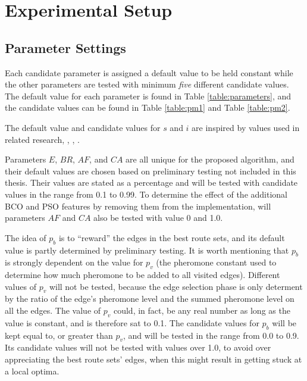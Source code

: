 \section{Experimental Setup}


\subsection{Parameter Settings}
\label{subsec:parameterSettings_setup}

Each candidate parameter is assigned a default value to be held constant while the other parameters are tested with minimum \textit{five} different candidate values. The default value for each parameter is found in Table \vref{table:parameters}, and the candidate values can be found in Table \vref{table:pm1} and Table \vref{table:pm2}.

The default value and candidate values for $s$ and $i$ are inspired by values used in related research\citep{salehi-nezhad07}, \citep{poorzahedy11}, \citep{sedighpour14}, \citep{kechagiopoulos14}.

Parameters $E$, $BR$, $AF$, and $CA$ are all unique for the proposed algorithm, and their default values are chosen based on preliminary testing not included in this thesis. Their values are stated as a percentage and will be tested with candidate values in the range from 0.1 to 0.99. To determine the effect of the additional BCO and PSO features by removing them from the implementation, will parameters $AF$ and $CA$ also be tested with value 0 and 1.0.

The idea of $p_b$ is to ``reward'' the edges in the best route sets, and its default value is partly determined by preliminary testing. It is worth mentioning that $p_ b$ is strongly dependent on the value for $p_v$ (the pheromone constant used to determine how much pheromone to be added to all visited edges). Different values of $p_v$ will not be tested, because the edge selection phase is only determent by the ratio of the edge's pheromone level and the summed pheromone level on all the edges. The value of $p_v$ could, in fact, be any real number as long as the value is constant, and is therefore sat to 0.1. The candidate values for $p_b$ will be kept equal to, or greater than $p_v$, and will be tested in the range from 0.0 to 0.9. Its candidate values will not be tested with values over 1.0, to avoid over appreciating the best route sets' edges, when this might result in getting stuck at a local optima.

